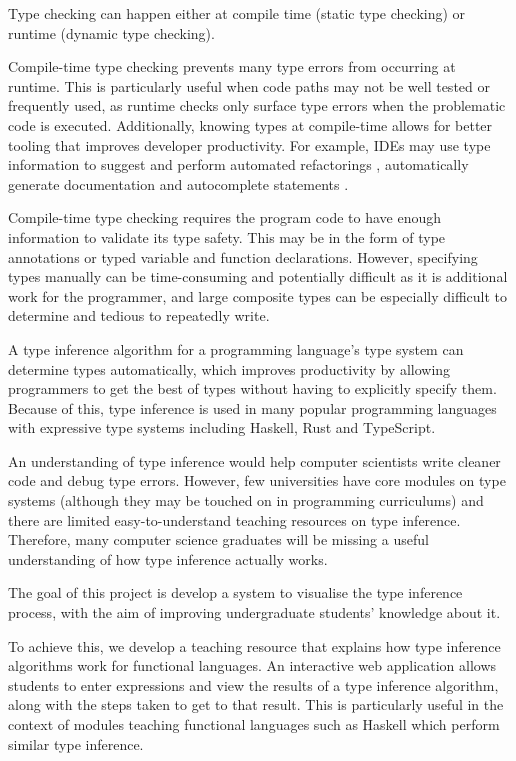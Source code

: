 \documentclass[a4paper,fleqn,12pt]{article}
\begin{document}
Type checking can happen either at compile time (static type checking) or runtime (dynamic type checking).

Compile-time type checking prevents many type errors from occurring at runtime. This is particularly useful when code paths may not be well tested or frequently used, as runtime checks only surface type errors when the problematic code is executed. Additionally, knowing types at compile-time allows for better tooling that improves developer productivity. For example, IDEs may use type information to suggest and perform automated refactorings \citep{ref1}, automatically generate documentation \citep{ref2} and autocomplete statements \citep{ref3}.

Compile-time type checking requires the program code to have enough information to validate its type safety. This may be in the form of type annotations or typed variable and function declarations. However, specifying types manually can be time-consuming and potentially difficult as it is additional work for the programmer, and large composite types can be especially difficult to determine and tedious to repeatedly write.

A type inference algorithm for a programming language’s type system can determine types automatically, which improves productivity by allowing programmers to get the best of types without having to explicitly specify them. Because of this, type inference is used in many popular programming languages with expressive type systems including Haskell, Rust and TypeScript.

An understanding of type inference would help computer scientists write cleaner code and debug type errors. However, few universities have core modules on type systems (although they may be touched on in programming curriculums) and there are limited easy-to-understand teaching resources on type inference. Therefore, many computer science graduates will be missing a useful understanding of how type inference actually works.

The goal of this project is develop a system to visualise the type inference process, with the aim of improving undergraduate students’ knowledge about it.

To achieve this, we develop a teaching resource that explains how type inference algorithms work for functional languages. An interactive web application allows students to enter expressions and view the results of a type inference algorithm, along with the steps taken to get to that result. This is particularly useful in the context of modules teaching functional languages such as Haskell which perform similar type inference.
\end{document}
